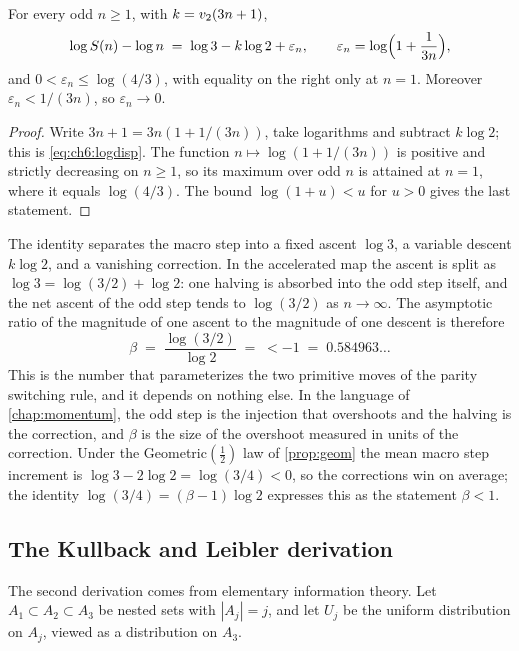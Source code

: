 \begin{lemma}\label{lem:ch6:logdisp}
For every odd $n\ge1$, with $k=v_2(3n+1)$,
\begin{equation}\label{eq:ch6:logdisp}
  \log S(n)-\log n \;=\; \log 3 - k\log 2 + \varepsilon_n,
  \qquad \varepsilon_n=\log\Bigl(1+\frac1{3n}\Bigr),
\end{equation}
and $0<\varepsilon_n\le\log(4/3)$, with equality on the right only at $n=1$.
Moreover $\varepsilon_n<1/(3n)$, so $\varepsilon_n\to0$.
\end{lemma}

\begin{proof}
Write $3n+1=3n(1+1/(3n))$, take logarithms and subtract $k\log2$; this is
\eqref{eq:ch6:logdisp}. The function $n\mapsto\log(1+1/(3n))$ is positive and
strictly decreasing on $n\ge1$, so its maximum over odd $n$ is attained at $n=1$,
where it equals $\log(4/3)$. The bound $\log(1+u)<u$ for $u>0$ gives the last
statement.
\end{proof}

The identity separates the macro step into a fixed ascent $\log 3$, a variable
descent $k\log 2$, and a vanishing correction. In the accelerated map the ascent
is split as $\log 3=\log(3/2)+\log 2$: one halving is absorbed into the odd
step itself, and the net ascent of the odd step tends to $\log(3/2)$ as
$n\to\infty$. The asymptotic ratio of the magnitude of one ascent to the
magnitude of one descent is therefore
\begin{equation}\label{eq:ch6:betadef}
  \beta \;=\; \frac{\log(3/2)}{\log 2} \;=\; \lt-1 \;=\; 0.584963\ldots
\end{equation}
This is the number that parameterizes the two primitive moves of the parity
switching rule, and it depends on nothing else. In the language of
\cref{chap:momentum}, the odd step is the injection that overshoots and the
halving is the correction, and $\beta$ is the size of the overshoot measured in
units of the correction. Under the Geometric$(\tfrac12)$ law of \cref{prop:geom}
the mean macro step increment is $\log 3-2\log 2=\log(3/4)<0$, so the corrections
win on average; the identity $\log(3/4)=(\beta-1)\log 2$ expresses this as the
statement $\beta<1$.

\subsection{The Kullback and Leibler derivation}

The second derivation comes from elementary information theory. Let
$A_1\subset A_2\subset A_3$ be nested sets with $|A_j|=j$, and let $U_j$ be the
uniform distribution on $A_j$, viewed as a distribution on $A_3$.

